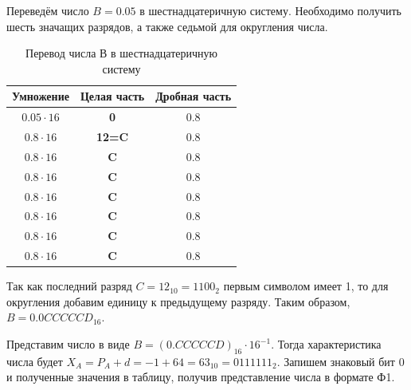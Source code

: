 Переведём число $B = 0.05$ в шестнадцатеричную систему. Необходимо получить шесть значащих
разрядов, а также седьмой для округления числа.

\begin{table}[H]
    \centering
    \caption{Перевод числа В в шестнадцатеричную систему}
    \begin{tabular}{|c|c|c|}
        \hline
        \small Умножение & \small Целая часть & \small Дробная часть \\
        \hline
        $0.05 \cdot 16$ & \textbf{0} & $0.8$ \\
        $0.8 \cdot 16$ & \textbf{12=C} & $0.8$ \\
        $0.8 \cdot 16$ & \textbf{C} & $0.8$ \\
        $0.8 \cdot 16$ & \textbf{C} & $0.8$ \\
        $0.8 \cdot 16$ & \textbf{C} & $0.8$ \\
        $0.8 \cdot 16$ & \textbf{C} & $0.8$ \\
        $0.8 \cdot 16$ & \textbf{C} & $0.8$ \\
        $0.8 \cdot 16$ & \textbf{C} & $0.8$ \\
        \hline		
    \end{tabular}
\end{table}

Так как последний разряд $C=12_{10}=1100_{2}$ первым символом имеет 1, то для округления добавим единицу
к предыдущему разряду. Таким образом, $B = 0.0CCCCCD_{16}$.

Представим число в виде $B=(0.CCCCCD)_{16} \cdot 16^{-1}$. Тогда характеристика числа будет
$X_{A}=P_{A}+d=-1+64=63_{10}=0111111_{2}$. Запишем знаковый бит 0 и полученные значения в таблицу,
получив представление числа в формате Ф1.

